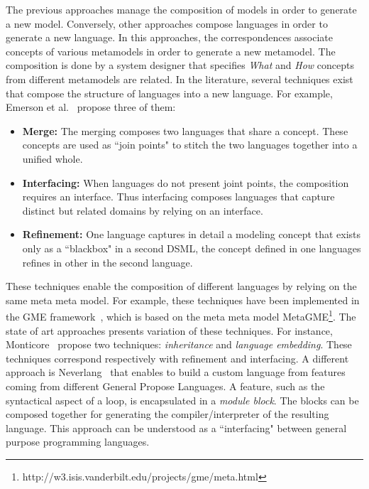 The previous approaches manage the composition of models in order to generate a new model. Conversely, other approaches compose languages in order to generate a new language. In this approaches, the correspondences associate concepts of various metamodels in order to generate a new metamodel. The composition is done by a system designer that specifies \emph{What} and \emph{How} concepts from different metamodels are related. In the literature, several techniques exist that compose the structure of languages into a new language. For example, Emerson et al.~\cite{metamodelcompo} propose three of them:
\begin{itemize}
	\item \textbf{Merge:} The merging composes two languages that share a concept. These concepts are used as ``join points" to stitch the two languages together into a unified whole.
	\item \textbf{Interfacing:} When languages do not present joint points, the composition requires an interface. Thus interfacing composes languages that capture distinct but related domains by relying on an interface.
	\item \textbf{Refinement:} One language captures in detail a modeling concept that exists only as a ``blackbox" in a second DSML, \ie the concept defined in one languages refines in other in the second language.
\end{itemize} 
These techniques enable the composition of different languages by relying on the same meta meta model. For example, these techniques have been implemented in the GME framework~\cite{metamodelcompo}, which is based on the meta meta model MetaGME\footnote{http://w3.isis.vanderbilt.edu/projects/gme/meta.html}. The state of art approaches presents variation of these techniques. For instance, Monticore~\cite{monticore} propose two techniques: \emph{inheritance} and \emph{language embedding}. These techniques correspond respectively with refinement and interfacing. A different approach is Neverlang~\cite{neverlang} that enables to build a custom language from features coming from different General Propose Languages. A feature, such as the syntactical aspect of a loop, is encapsulated in a \emph{module block}. The blocks can be composed together for generating the compiler/interpreter of the resulting language. This approach can be understood as a ``interfacing" between general purpose programming languages.

